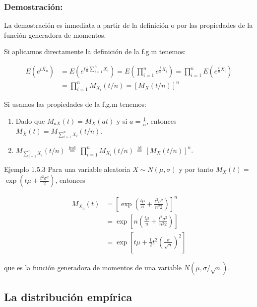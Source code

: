 \documentclass[
]{article}
\providecommand{\tightlist}{%
  \setlength{\itemsep}{0pt}\setlength{\parskip}{0pt}}
\begin{document}
\subsubsection{Demostración:}\label{demostraciuxf3n}

La demostración es inmediata a partir de la definición o por las propiedades de la función generadora de momentos.

Si aplicamos directamente la definición de la f.g.m tenemos:

\[
\begin{aligned}
E\left(e^{t \bar{X}_{n}}\right) & =E\left(e^{t \frac{1}{n} \sum_{i=1}^{n} X_{i}}\right)=E\left(\prod_{i=1}^{n} e^{\frac{t}{n} X_{i}}\right)=\prod_{i=1}^{n} E\left(e^{\frac{t}{n} X_{i}}\right) \\
& =\prod_{i=1}^{n} M_{X_{i}}(t / n)=\left[M_{X}(t / n)\right]^{n}
\end{aligned}
\]

Si usamos las propiedades de la f.g.m tenemos:

\begin{enumerate}
\def\labelenumi{\arabic{enumi}.}
\tightlist
\item
  Dado que \(M_{a X}(t)=M_{X}(a t)\) y si \(a=\frac{1}{n}\), entonces \(M_{\bar{X}}(t)=M_{\sum_{i=1}^{n} X_{i}}(t / n)\).
\item
  \(M_{\sum_{i=1}^{n} X_{i}}(t / n) \stackrel{\text { ind }}{=} \prod_{i=1}^{n} M_{X_{i}}(t / n) \stackrel{\text { id }}{=}\left[M_{X}(t / n)\right]^{n}\).
\end{enumerate}

Ejemplo 1.5.3 Para una variable aleatoria \(X \sim N(\mu, \sigma)\) y por tanto \(M_{X}(t)=\) \(\exp \left(t \mu+\frac{t^{2} \sigma^{2}}{2}\right)\), entonces

\[
\begin{aligned}
M_{\bar{X}_{n}}(t) & =\left[\exp \left(\frac{t \mu}{n}+\frac{t^{2} \sigma^{2}}{n^{2} 2}\right)\right]^{n} \\
& =\exp \left[n\left(\frac{t \mu}{n}+\frac{t^{2} \sigma^{2}}{n^{2} 2}\right)\right] \\
& =\exp \left[t \mu+\frac{1}{2} t^{2}\left(\frac{\sigma}{\sqrt{n}}\right)^{2}\right]
\end{aligned}
\]

que es la función generadora de momentos de una variable \(N(\mu, \sigma / \sqrt{n})\).

\subsection{La distribución empírica}\label{la-distribuciuxf3n-empuxedrica}
\end{document}
